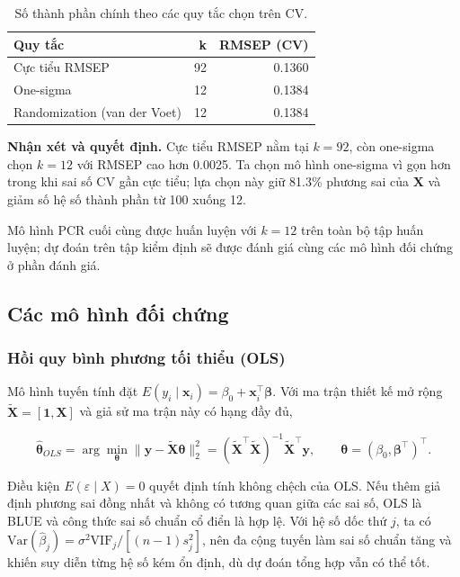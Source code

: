 \begin{longtable}[t]{lrr}
\caption{\label{tab:pcr-cv}Số thành phần chính theo các quy tắc chọn trên CV.}\\
\toprule
Quy tắc & k & RMSEP (CV)\\
\midrule
Cực tiểu RMSEP & 92 & 0.1360\\
One-sigma & 12 & 0.1384\\
Randomization (van der Voet) & 12 & 0.1384\\
\bottomrule
\end{longtable}

\textbf{Nhận xét và quyết định.} Cực tiểu RMSEP nằm tại \(k = 92\), còn
one-sigma chọn \(k = 12\) với RMSEP cao hơn 0.0025. Ta chọn mô hình
one-sigma vì gọn hơn trong khi sai số CV gần cực tiểu; lựa chọn này giữ
81.3\% phương sai của \(\mathbf X\) và giảm số hệ số thành phần từ 100
xuống 12.

Mô hình PCR cuối cùng được huấn luyện với \(k = 12\) trên toàn bộ tập
huấn luyện; dự đoán trên tập kiểm định sẽ được đánh giá cùng các mô hình
đối chứng ở phần đánh giá.

\subsection{Các mô hình đối
chứng}\label{cuxe1c-muxf4-huxecnh-ux111ux1ed1i-chux1ee9ng}

\subsubsection{Hồi quy bình phương tối thiểu
(OLS)}\label{hux1ed3i-quy-buxecnh-phux1b0ux1a1ng-tux1ed1i-thiux1ec3u-ols}

Mô hình tuyến tính đặt
\(E(y_i\mid\mathbf x_i)=\beta_0+\mathbf x_i^\top\boldsymbol\beta\). Với
ma trận thiết kế mở rộng \(\widetilde{\mathbf X}=[\mathbf 1,\mathbf X]\)
và giả sử ma trận này có hạng đầy đủ,

\[
\hat{\boldsymbol\theta}_{OLS}
=\arg\min_{\boldsymbol\theta}\|\mathbf y-\widetilde{\mathbf X}\boldsymbol\theta\|_2^2
=(\widetilde{\mathbf X}^{\top}\widetilde{\mathbf X})^{-1}
\widetilde{\mathbf X}^{\top}\mathbf y,
\qquad \boldsymbol\theta=(\beta_0,\boldsymbol\beta^\top)^\top.
\]

Điều kiện \(E(\varepsilon\mid X)=0\) quyết định tính không chệch của
OLS. Nếu thêm giả định phương sai đồng nhất và không có tương quan giữa
các sai số, OLS là BLUE và công thức sai số chuẩn cổ điển là hợp lệ. Với
hệ số dốc thứ \(j\), ta có
\(\mathrm{Var}(\hat\beta_j)=\sigma^2\mathrm{VIF}_j/[(n-1)s_j^2]\), nên
đa cộng tuyến làm sai số chuẩn tăng và khiến suy diễn từng hệ số kém ổn
định, dù dự đoán tổng hợp vẫn có thể tốt.

